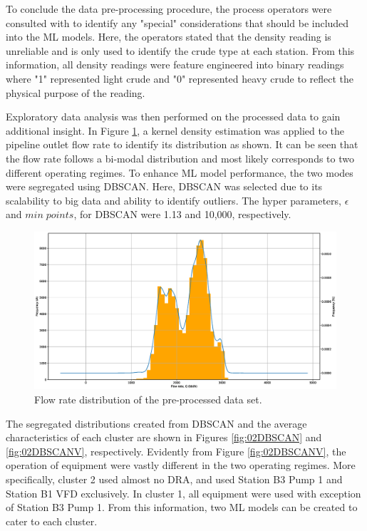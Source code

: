 To conclude the data pre-processing procedure, the process operators were consulted with to identify any "special" considerations that should be included into the ML models.  Here, the operators stated that the density reading is unreliable and is only used to identify the crude type at each station. From this information, all density readings were feature engineered into binary readings where "1" represented light crude and "0" represented heavy crude to reflect the physical purpose of the reading.

Exploratory data analysis was then performed on the processed data to gain additional insight. In Figure \ref{fig:02KDE}, a kernel density estimation was applied to the pipeline outlet flow rate to identify its distribution as shown.  It can be seen that the flow rate follows a bi-modal distribution and most likely corresponds to two different operating regimes. To enhance ML model performance, the two modes were segregated using DBSCAN.  Here, DBSCAN was selected due to its scalability to big data and ability to identify outliers. The hyper parameters, $\epsilon$ and $min \; points$, for DBSCAN were 1.13 and 10,000, respectively.

\begin{figure}[h]
    \centering
    \includegraphics[width=\textwidth]{images/suncor/08Flowrate_KDE.eps}
    \caption{Flow rate distribution of the pre-processed data set.}
    \label{fig:02KDE}
\end{figure}

The segregated distributions created from DBSCAN and the average characteristics of each cluster are shown in Figures \ref{fig:02DBSCAN} and \ref{fig:02DBSCANV}, respectively.  Evidently from Figure \ref{fig:02DBSCANV}, the operation of equipment were vastly different in the two operating regimes.  More specifically, cluster 2 used almost no DRA, and used Station B3 Pump 1 and Station B1 VFD exclusively.  In cluster 1, all equipment were used with exception of Station B3 Pump 1.  From this information, two ML models can be created to cater to each cluster.

